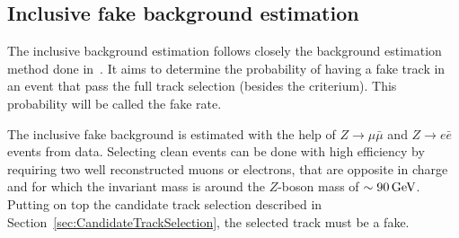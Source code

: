 \subsection*{Inclusive fake background estimation}
The inclusive background estimation follows closely the background estimation method done in~\cite{bib:CMS:DT_Thesis,bib:CMS:DT_8TeV_AN}.
It aims to determine the probability of having a fake track in an event that pass the full track selection (besides the \ias criterium).
This probability will be called the fake rate.

The inclusive fake background is estimated with the help of $Z\rightarrow\mu\bar{\mu}$ and $Z\rightarrow e\bar{e}$ events from data.
Selecting clean \Zlep events can be done with high efficiency by requiring two well reconstructed muons or electrons, that are opposite in charge and for which the invariant mass is around the $Z$-boson mass of $\sim90\,\text{Ge}\kern-0.06667em\text{V}$.
Putting on top the candidate track selection described in Section~\ref{sec:CandidateTrackSelection}, the selected track must be a fake.

